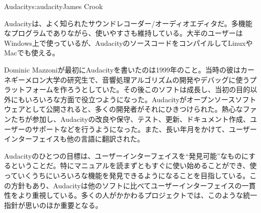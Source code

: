 \begin{aosachapter}{Audacity}{s:audacity}{James Crook}

Audacityは、よく知られたサウンドレコーダー/オーディオエディタだ。多機能なプログラムでありながら、使いやすさも維持している。大半のユーザーはWindows上で使っているが、AudacityのソースコードをコンパイルしてLinuxやMacでも使える。

Dominic Mazzoniが最初にAudacityを書いたのは1999年のこと。当時の彼はカーネギーメロン大学の研究生で、音響処理アルゴリズムの開発やデバッグに使うプラットフォームを作ろうとしていた。その後このソフトは成長し、当初の目的以外にもいろいろな方面で役立つようになった。Audacityがオープンソースソフトウェアとして公開されると、多くの開発者がそれにひきつけられた。熱心なファンたちが参加し、Audacityの改良や保守、テスト、更新、ドキュメント作成、ユーザーのサポートなどを行うようになった。また、長い年月をかけて、ユーザーインターフェイスも他の言語に翻訳された。

Audacityのひとつの目標は、ユーザーインターフェイスを``発見可能''なものにするということだ。特にマニュアルを読まずともすぐに使い始めることができ、使っていくうちにいろいろな機能を発見できるようになることを目指している。この方針もあり、Audacityは他のソフトに比べてユーザーインターフェイスの一貫性をより重視している。多くの人がかかわるプロジェクトでは、このような統一指針が思いのほか重要となる。


\end{aosachapter}
